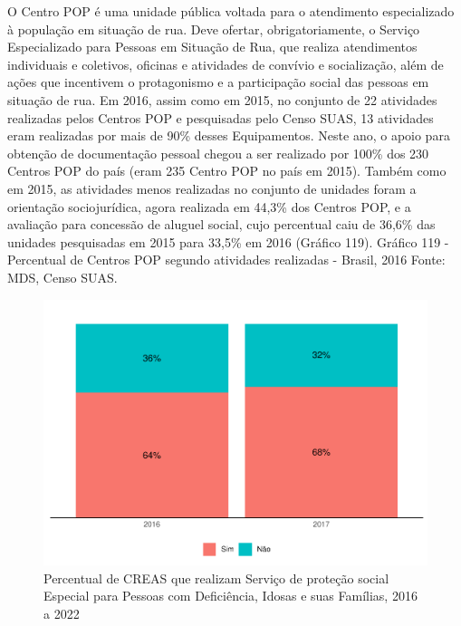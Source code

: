 \documentclass[
  brazilian]{report}
\begin{document}
O Centro POP é uma unidade pública voltada para o atendimento
especializado à população em situação de rua. Deve ofertar,
obrigatoriamente, o Serviço Especializado para Pessoas em Situação de
Rua, que realiza atendimentos individuais e coletivos, oficinas e
atividades de convívio e socialização, além de ações que incentivem o
protagonismo e a participação social das pessoas em situação de rua. Em
2016, assim como em 2015, no conjunto de 22 atividades realizadas pelos
Centros POP e pesquisadas pelo Censo SUAS, 13 atividades eram realizadas
por mais de 90\% desses Equipamentos. Neste ano, o apoio para obtenção
de documentação pessoal chegou a ser realizado por 100\% dos 230 Centros
POP do país (eram 235 Centro POP no país em 2015). Também como em 2015,
as atividades menos realizadas no conjunto de unidades foram a
orientação sociojurídica, agora realizada em 44,3\% dos Centros POP, e a
avaliação para concessão de aluguel social, cujo percentual caiu de
36,6\% das unidades pesquisadas em 2015 para 33,5\% em 2016 (Gráfico
119). Gráfico 119 - Percentual de Centros POP segundo atividades
realizadas - Brasil, 2016 Fonte: MDS, Censo SUAS.

\begin{figure}
\includegraphics{Censo-SUAS-2022_files/figure-latex/CREAS-PSE-Domicilio-1} \caption[Percentual de CREAS que realizam Serviço de proteção social Especial para Pessoas com Deficiência, Idosas e suas Famílias, 2016 a 2022]{Percentual de CREAS que realizam Serviço de proteção social Especial para Pessoas com Deficiência, Idosas e suas Famílias, 2016 a 2022}\label{fig:CREAS-PSE-Domicilio}
\end{figure}
\end{document}
